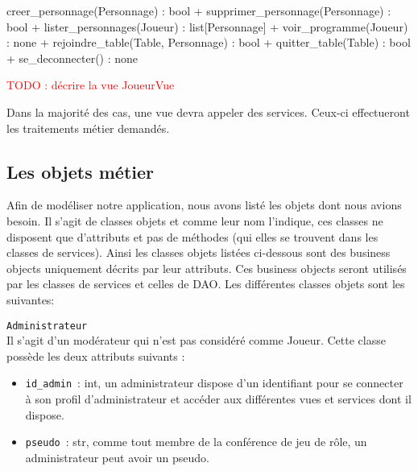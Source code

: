 \documentclass[11pt]{article}
\begin{document}
creer\_personnage(Personnage) : bool
+ supprimer\_personnage(Personnage) : bool
+ lister\_personnages(Joueur) : list[Personnage]
+ voir\_programme(Joueur) : none
+ rejoindre\_table(Table, Personnage) : bool
+ quitter\_table(Table) : bool
+ se\_deconnecter() : none






\textcolor{red}{TODO : décrire la vue JoueurVue}






\bigbreak
Dans la majorité des cas, une vue devra appeler des services. Ceux-ci effectueront les traitements métier demandés.


\subsection{Les objets métier}

Afin de modéliser notre application, nous avons listé les objets dont nous avions besoin. Il s’agit de classes objets et comme leur nom l’indique, ces classes ne disposent que d’attributs et pas de méthodes (qui elles se trouvent dans les classes de services). Ainsi les classes objets listées ci-dessous sont des business objects uniquement décrits par leur attributs. Ces business objects seront utilisés par les classes de services et celles de DAO. Les différentes classes objets sont les suivantes:

\bigbreak

\texttt{Administrateur}\\
Il s’agit d’un modérateur qui n’est pas considéré comme Joueur. Cette classe possède les deux attributs suivants :
\begin{itemize}[label=, font=\small]
    \item \texttt{id\_admin}~: int, un administrateur dispose d'un identifiant pour se connecter à son profil d'administrateur et accéder aux différentes vues et services dont il dispose.
    \item \texttt{pseudo}~: str, comme tout membre de la conférence de jeu de rôle, un administrateur peut avoir un pseudo.
\end{itemize}

\bigbreak
\end{document}
